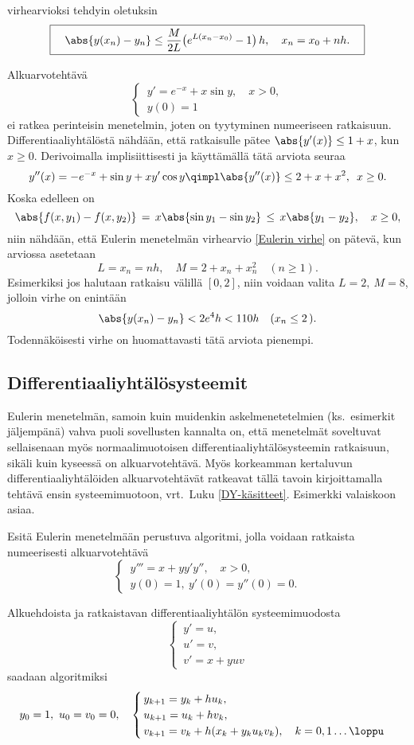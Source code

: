 virhearvioksi tehdyin oletuksin
\begin{equation} \label{Eulerin virhe}
\boxed{\quad
\abs{y(x_n)-y_n} \le \frac{M}{2L}\bigl(e^{L(x_n-x_0)}-1\bigr)\,h, \quad x_n=x_0+nh. \quad}
\end{equation}
\begin{Exa} Alkuarvotehtävä
\[
\begin{cases} \,y'=e^{-x}+x\sin y, \quad x>0, \\ \,y(0)=1 \end{cases}
\]
ei ratkea perinteisin menetelmin, joten on tyytyminen numeeriseen ratkaisuun.
Differentiaaliyhtälöstä nähdään, että ratkaisulle pätee $\abs{y'(x)} \le 1+x$, kun $x \ge 0$.
Derivoimalla implisiittisesti ja käyttämällä tätä arviota seuraa
\[
y''(x)=-e^{-x}+\sin y+xy'\cos y \qimpl \abs{y''(x)} \le 2+x+x^2,\,\ x \ge 0.
\]
Koska edelleen on
\[
\abs{f(x,y_1)-f(x,y_2)}\,=\,x\abs{\sin y_1-\sin y_2}\,\le\,x\abs{y_1-y_2}, \quad x \ge 0,
\]
niin nähdään, että Eulerin menetelmän virhearvio \eqref{Eulerin virhe} on pätevä, kun arviossa
asetetaan
\[
L=x_n=nh, \quad M=2+x_n+x_n^2 \quad (n \ge 1).
\]
Esimerkiksi jos halutaan ratkaisu välillä $[0,2]$, niin voidaan valita $L=2,\ M=8$, jolloin
virhe on enintään
\[
\abs{y(x_n)-y_n} < 2e^4 h < 110 h \quad (x_n \le 2\,).
\]
Todennäköisesti virhe on huomattavasti tätä arviota pienempi. \loppu
\end{Exa}

\subsection{Differentiaaliyhtälösysteemit}

Eulerin menetelmän, samoin kuin muidenkin askelmenetetelmien (ks.\ esimerkit jäljempänä) vahva
puoli sovellusten kannalta on, että menetelmät soveltuvat sellaisenaan myös normaalimuotoisen 
differentiaaliyhtälösysteemin ratkaisuun, sikäli kuin kyseessä on alkuarvotehtävä. Myös 
korkeamman kertaluvun differentiaaliyhtälöiden alkuarvotehtävät ratkeavat tällä tavoin 
kirjoittamalla tehtävä ensin systeemimuotoon, vrt.\ Luku \ref{DY-käsitteet}. Esimerkki
valaiskoon asiaa.
\begin{Exa} Esitä Eulerin menetelmään perustuva algoritmi, jolla voidaan ratkaista numeerisesti
alkuarvotehtävä
\[
\begin{cases} \,y'''=x+yy'y'', \quad x>0, \\ \,y(0)=1,\ y'(0)=y''(0)=0. \end{cases}
\]
\end{Exa}
\ratk Alkuehdoista ja ratkaistavan differentiaaliyhtälön systeemimuodosta
\[
\begin{cases} \,y'=u, \\ \,u'=v, \\ \,v'=x+yuv \end{cases}
\]
saadaan algoritmiksi
\[
y_0=1,\ u_0=v_0=0, \quad
\begin{cases}
\,y_{k+1}=y_k+hu_k, \\ 
\,u_{k+1}=u_k+hv_k, \\ 
\,v_{k+1}=v_k+h(x_k+y_ku_kv_k), \quad k=0,1 \ldots \loppu
\end{cases}
\]

